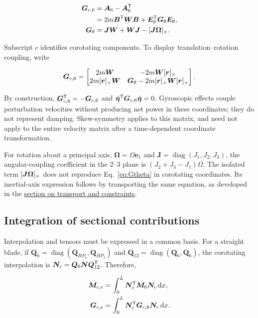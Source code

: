 \begin{align}
\bm G_{c,6}&=\bm A_6-\bm A_6^\mathsf T\nonumber\\
&=2m\bm B^\mathsf T\bm W\bm B+\bm E_\theta^\mathsf T\bm G_\theta\bm E_\theta,\label{eq:G6}\\
\bm G_\theta&=\bm J\bm W+\bm W\bm J-[\bm{J\Omega}]_\times.
\label{eq:Gtheta}
\end{align}

Subscript $c$ identifies corotating components. To display translation--rotation coupling, write

\begin{equation}
\bm G_{c,6}=\begin{bmatrix}
2m\bm W&-2m\bm W[\bm{r}]_\times\\
2m[\bm{r}]_\times\bm W&\bm G_\theta-2m[\bm{r}]_\times\bm W[\bm{r}]_\times
\end{bmatrix}.
\label{eq:Gblocks}
\end{equation}

By construction, $\bm G_{c,6}^\mathsf T=-\bm G_{c,6}$ and $\dot{\bm\eta}^\mathsf T\bm G_{c,6}\dot{\bm\eta}=0$. Gyroscopic effects couple perturbation velocities without producing net power in these coordinates; they do not represent damping. Skew-symmetry applies to this matrix, and need not apply to the entire velocity matrix after a time-dependent coordinate transformation.

For rotation about a principal axis, $\bm\Omega=\Omega\bm e_1$ and $\bm J=\operatorname{diag}(J_1,J_2,J_3)$, the angular-coupling coefficient in the $2$--$3$ plane is $(J_2+J_3-J_1)\Omega$. The isolated term $[\bm{J\Omega}]_\times$ does not reproduce Eq.~\eqref{eq:Gtheta} in corotating coordinates. Its inertial-axis expression follows by transporting the same equation, as developed in the \hyperref[sec:transporte]{section on transport and constraints}.

\subsection{Integration of sectional contributions}
Interpolation and tensors must be expressed in a common basis. For a straight blade, if $\bm Q_6=\operatorname{diag}(\bm Q_{HP_b},\bm Q_{HP_b})$ and $\bm Q_{12}=\operatorname{diag}(\bm Q_6,\bm Q_6)$, the corotating interpolation is $\bm N_c=\bm Q_6\bm N\bm Q_{12}^\mathsf T$. Therefore,

\begin{align}
\bm M_{c,e}&=\int_0^L\bm N_c^\mathsf T\bm M_6\bm N_c\,\mathrm d x,\nonumber\\
\bm G_{c,e}&=\int_0^L\bm N_c^\mathsf T\bm G_{c,6}\bm N_c\,\mathrm d x.
\end{align}

